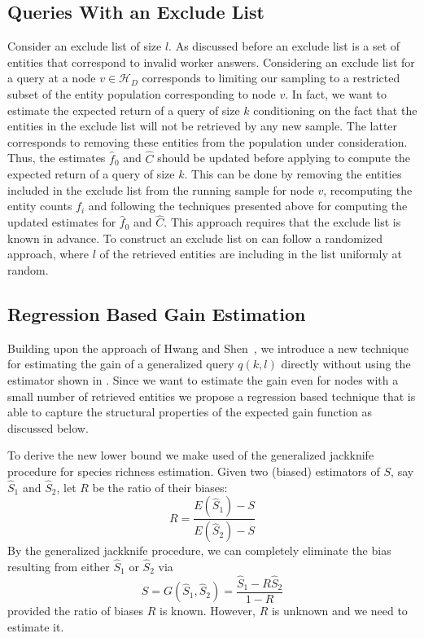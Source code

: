\documentclass{vldb}
\newcommand{\hierarchy}{\mathcal{H}_D}
\begin{document}
\subsection{Queries With an Exclude List}
\label{sec:excludelist}
Consider an exclude list of size $l$. As discussed before an exclude list is a set of entities that correspond to invalid worker answers. Considering an exclude list for a query at a node $v \in \hierarchy$ corresponds to limiting our sampling to a restricted subset of the entity population corresponding to node $v$. In fact, we want to estimate the expected return of a query of size $k$ conditioning on the fact that the entities in the exclude list will not be retrieved by any new sample. The latter corresponds to removing these entities from the population under consideration. Thus, the estimates $\hat{f}_0$ and $\hat{C}$ should be updated before applying  to compute the expected return of a query of size $k$. This can be done by removing the entities included in the exclude list from the running sample for node $v$, recomputing the entity counts $f_i$ and following the techniques presented above for computing the updated estimates for $\hat{f}_0$ and $\hat{C}$. This approach requires that the exclude list is known in advance. To construct an exclude list on can follow a randomized approach, where $l$ of the retrieved entities are including in the list uniformly at random. 

\subsection{Regression Based Gain Estimation}
\label{sec:newestim}
Building upon the approach of Hwang and Shen~\cite{hwang:2010}, we introduce a new technique for estimating the gain of a generalized query $q(k,l)$ directly without using the estimator shown in . Since we want to estimate the gain even for nodes with a small number of retrieved entities we propose a regression based technique that is able to capture the structural properties of the expected gain function as discussed below. 

To derive the new lower bound we make used of the generalized jackknife procedure for species richness estimation. Given two (biased) estimators of $S$, say $\hat{S}_1$ and $\hat{S}_2$, let $R$ be the ratio of their biases:
\begin{equation}
R = \frac{E(\hat{S}_1) - S}{E(\hat{S}_2) - S}
\end{equation}
By the generalized jackknife procedure, we can completely eliminate the bias resulting from either $\hat{S}_1$ or $\hat{S}_2$ via
\begin{equation}
S = G(\hat{S}_1, \hat{S}_2) = \frac{\hat{S}_1 - R\hat{S}_2}{1 - R}
\label{eq:jknife}
\end{equation}
provided the ratio of biases $R$ is known. However, $R$ is unknown and we need to estimate it. 
\end{document}
